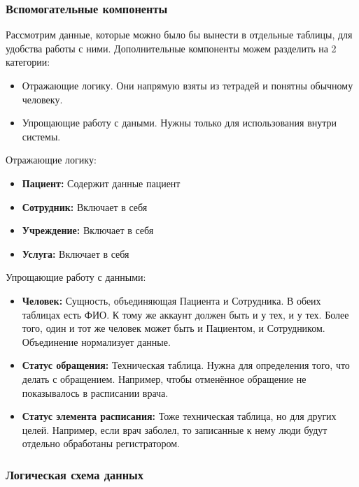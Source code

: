 \documentclass[a4paper,article]{article}
\begin{document}
    \subsubsection{Вспомогательные компоненты}\label{Проектирование БД. Вспомогательные компоненты}

    Рассмотрим данные, которые можно было бы вынести в отдельные таблицы, для удобства работы с ними. Дополнительные компоненты можем разделить на 2 категории:

    \begin{itemize}[nolistsep]
        \item Отражающие логику. Они напрямую взяты из тетрадей и понятны обычному человеку.
        \item Упрощающие работу с даными. Нужны только для использования внутри системы.
    \end{itemize}

    Отражающие логику:

    \begin{itemize}[nolistsep]
        \item \textbf{Пациент:} Содержит данные пациент
        \item \textbf{Сотрудник:} Включает в себя
        \item \textbf{Учреждение:} Включает в себя
        \item \textbf{Услуга:} Включает в себя
    \end{itemize}

    Упрощающие работу с данными:

    \begin{itemize}[nolistsep]
        \item \textbf{Человек:} Сущность, объединяющая Пациента и Сотрудника. В обеих таблицах есть ФИО. К тому же аккаунт должен быть и у тех, и у тех. Более того, один и тот же человек может быть и Пациентом, и Сотрудником. Объединение нормализует данные.
        \item \textbf{Статус обращения:} Техническая таблица. Нужна для определения того, что делать с обращением. Например, чтобы отменённое обращение не показывалось в расписании врача.
        \item \textbf{Статус элемента расписания:} Тоже техническая таблица, но для других целей. Например, если врач заболел, то записанные к нему люди будут отдельно обработаны регистратором.
    \end{itemize}

    \subsubsection{Логическая схема данных}
\end{document}
